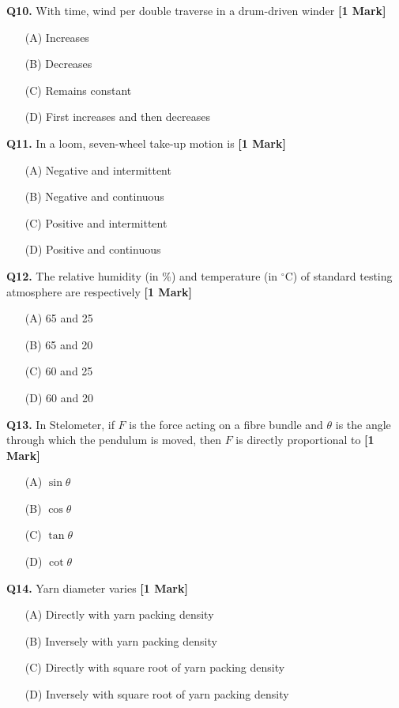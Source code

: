 \documentclass[11pt]{article}
\newcommand{\questiona}[2]{
    \noindent\textbf{Q#2.} #1 \hfill \textbf{[1 Mark]}
}
\begin{document}
\questiona{With time, wind per double traverse in a drum-driven winder}{10}
\begin{enumerate}
    \item[(A)] Increases
    \item[(B)] Decreases
    \item[(C)] Remains constant
    \item[(D)] First increases and then decreases
\end{enumerate}
\vspace{0.5cm}

\questiona{In a loom, seven-wheel take-up motion is}{11}
\begin{enumerate}
    \item[(A)] Negative and intermittent
    \item[(B)] Negative and continuous
    \item[(C)] Positive and intermittent
    \item[(D)] Positive and continuous
\end{enumerate}
\vspace{0.5cm}

\questiona{The relative humidity (in \%) and temperature (in \(^{\circ}\)C) of standard testing atmosphere are respectively}{12}
\begin{enumerate}
    \item[(A)] 65 and 25
    \item[(B)] 65 and 20
    \item[(C)] 60 and 25
    \item[(D)] 60 and 20
\end{enumerate}
\vspace{0.5cm}

\questiona{In Stelometer, if \(F\) is the force acting on a fibre bundle and \(\theta\) is the angle through which the pendulum is moved, then \(F\) is directly proportional to}{13}
\begin{enumerate}
    \item[(A)] \(\sin \theta\)
    \item[(B)] \(\cos \theta\)
    \item[(C)] \(\tan \theta\)
    \item[(D)] \(\cot \theta\)
\end{enumerate}
\vspace{0.5cm}

\questiona{Yarn diameter varies}{14}
\begin{enumerate}
    \item[(A)] Directly with yarn packing density
    \item[(B)] Inversely with yarn packing density
    \item[(C)] Directly with square root of yarn packing density
    \item[(D)] Inversely with square root of yarn packing density
\end{enumerate}
\vspace{0.5cm}
\end{document}
